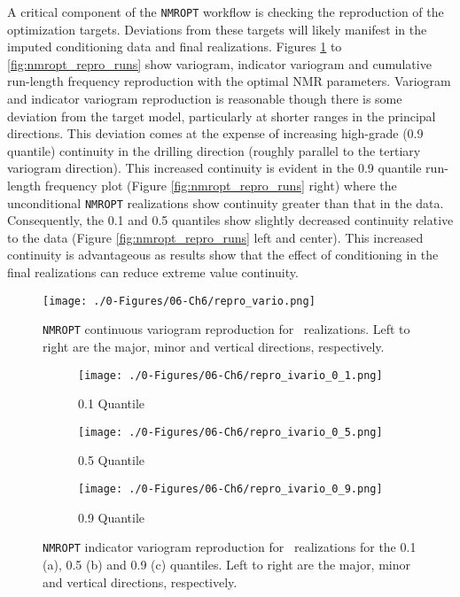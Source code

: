 A critical component of the \texttt{NMROPT} workflow is checking the reproduction of the optimization targets. Deviations from these targets will likely manifest in the imputed conditioning data and final realizations. Figures \ref{fig:nmropt_repro_vario} to \ref{fig:nmropt_repro_runs} show variogram, indicator variogram and cumulative run-length frequency reproduction with the optimal \gls{NMR} parameters. Variogram and indicator variogram reproduction is reasonable though there is some deviation from the target model, particularly at shorter ranges in the principal directions. This deviation comes at the expense of increasing high-grade (0.9 quantile) continuity in the drilling direction (roughly parallel to the tertiary variogram direction). This increased continuity is evident in the 0.9 quantile run-length frequency plot (Figure \ref{fig:nmropt_repro_runs} right) where the unconditional \texttt{NMROPT} realizations show continuity greater than that in the data. Consequently, the 0.1 and 0.5 quantiles show slightly decreased continuity relative to the data (Figure \ref{fig:nmropt_repro_runs} left and center). This increased continuity is advantageous as results show that the effect of conditioning in the final realizations can reduce extreme value continuity.

\begin{figure}[htb!]
    \centering
    \texttt{[image: ./0-Figures/06-Ch6/repro\_vario.png]}
    \caption{\texttt{NMROPT} continuous variogram reproduction for \csnreals \ realizations. Left to right are the major, minor and vertical directions, respectively.}
    \label{fig:nmropt_repro_vario}
\end{figure}

\begin{figure}
    \begin{subfigure}{1.0\textwidth}
        \centering
        \texttt{[image: ./0-Figures/06-Ch6/repro\_ivario\_0\_1.png]}
        \caption{0.1 Quantile}
    \end{subfigure}
    \begin{subfigure}{1.0\textwidth}
        \centering
        \texttt{[image: ./0-Figures/06-Ch6/repro\_ivario\_0\_5.png]}
        \caption{0.5 Quantile}
    \end{subfigure}
    \begin{subfigure}{1.0\textwidth}
        \centering
        \texttt{[image: ./0-Figures/06-Ch6/repro\_ivario\_0\_9.png]}
        \caption{0.9 Quantile}
    \end{subfigure}
    \caption{\texttt{NMROPT} indicator variogram reproduction for \csnreals \ realizations for the 0.1 (a), 0.5 (b) and 0.9 (c) quantiles. Left to right are the major, minor and vertical directions, respectively.}
    \label{fig:nmropt_repro_ivario}
\end{figure}

